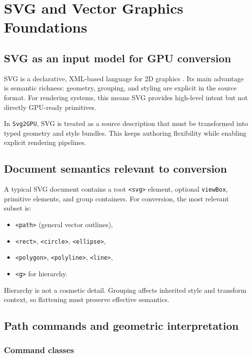 \chapter{SVG and Vector Graphics Foundations}
\label{chap:svg_foundations}

\section{SVG as an input model for GPU conversion}

SVG is a declarative, XML-based language for 2D graphics \cite{w3c_svg2}.
Its main advantage is semantic richness: geometry, grouping, and styling are explicit in the source format.
For rendering systems, this means SVG provides high-level intent but not directly GPU-ready primitives.

In \texttt{Svg2GPU}, SVG is treated as a source description that must be transformed into typed geometry and style bundles.
This keeps authoring flexibility while enabling explicit rendering pipelines.

\section{Document semantics relevant to conversion}

A typical SVG document contains a root \texttt{<svg>} element, optional \texttt{viewBox}, primitive elements, and group containers.
For conversion, the most relevant subset is:

\begin{itemize}
\item \texttt{<path>} (general vector outlines),
\item \texttt{<rect>}, \texttt{<circle>}, \texttt{<ellipse>},
\item \texttt{<polygon>}, \texttt{<polyline>}, \texttt{<line>},
\item \texttt{<g>} for hierarchy.
\end{itemize}

Hierarchy is not a cosmetic detail.
Grouping affects inherited style and transform context, so flattening must preserve effective semantics.

\section{Path commands and geometric interpretation}

\subsection{Command classes}

